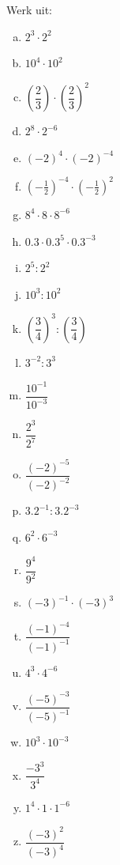 \documentclass[12pt,twoside]{article}
\begin{document}
\begin{oefening}
Werk uit:
\begin{multicols}{3}
  \begin{enumerate}[(a)]
  \itemsep.5em
    \item $2^3\cdot 2^2$
    \item $10^4\cdot 10^2$
    \item $\left(\dfrac{2}{3}\right)\cdot \left(\dfrac{2}{3}\right)^2$
    \item $2^8\cdot 2^{-6}$
    \item $\left(-2\right)^4\cdot \left(-2\right)^{-4}$
    \item $\left(-\frac{1}{2}\right)^{-4}\cdot \left(-\frac{1}{2}\right)^2$
    \item $8^4\cdot 8\cdot 8^{-6}$
    \item $0.3\cdot 0.3^5\cdot 0.3^{-3}$
    \item $2^5: 2^2$
    \item $10^3: 10^2$
    \item $\left(\dfrac{3}{4}\right)^3: \left(\dfrac{3}{4}\right)$
    \item $3^{-2}: 3^3$
    \item $\dfrac{10^{-1}}{10^{-3}}$
    \item $\dfrac{2^{3}}{2^{7}}$
    \item $\dfrac{(-2)^{-5}}{(-2)^{-2}}$
    \item $3.2^{-1}:3.2^{-3}$
    \item $6^2\cdot 6^{-3}$
    \item $\dfrac{9^4}{9^2}$
    \item $\left(-3\right)^{-1}\cdot \left(-3\right)^3$
    \item $\dfrac{\left(-1\right)^{-4}}{\left(-1\right)^{-1}}$
    \item $4^3\cdot 4^{-6}$
    \item $\dfrac{\left(-5\right)^{-3}}{\left(-5\right)^{-1}}$
    \item $10^3\cdot 10^{-3}$
    \item $\dfrac{-3^3}{3^4}$
    \item $1^4\cdot1\cdot1^{-6}$
    \item $\dfrac{\left(-3\right)^{2}}{\left(-3\right)^{4}}$
  \end{enumerate}
\end{multicols}
\end{oefening}
\end{document}
